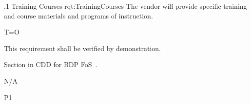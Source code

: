 

\ONERQMTV
{\RqtNumberBase.1}
{Training Courses}
{rqt:TrainingCourses}
{The vendor will provide specific training and course materials and programs of instruction.}
{
	\item [Phase 1] T=O
}
{This requirement shall be verified by demonstration.}
{
\item [12.3] Section in CDD for BDP FoS~\cite{ref__BDP_FOS_CDD}.
}
{
	\item N/A
}
{P1}
